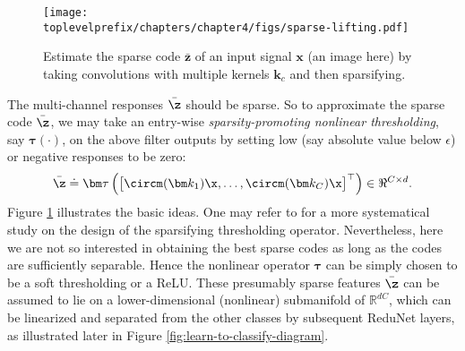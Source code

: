 \documentclass[../../book-main.tex]{subfiles}
\begin{document}
\begin{figure}[t]
	\centerline{
\texttt{[image: \\toplevelprefix/chapters/chapter4/figs/sparse-lifting.pdf]}}
\caption{Estimate the sparse code $\bar{\bm z}$ of an input signal $\bm x$ (an image here) by taking convolutions with multiple kernels $\bm k_c$ and then sparsifying.}
		\label{fig:multi-channel-sparse-lifting}
\end{figure}
The multi-channel responses $\bar \z$ should be sparse. So to approximate the sparse code $\bar \z$, we may take an entry-wise {\em sparsity-promoting nonlinear thresholding}, say $\bm \tau(\cdot)$, on the above filter outputs by setting low (say absolute value below $\epsilon$) or negative  responses to be zero:
\begin{equation}
\bar \z \doteq \bm \tau \left( \big[\circm(\bm k_1) \x, \ldots, \circm(\bm k_C) \x \big]^\top \right) \in \Re^{C \times d}.
\label{eqn:sparse-lifting}
\end{equation} 
Figure \ref{fig:multi-channel-sparse-lifting} illustrates the basic ideas. One may refer to \cite{Analysis-Filter} for a more systematical study on the design of the sparsifying thresholding operator. Nevertheless, here we are not so interested in obtaining the best sparse codes as long as the codes are sufficiently separable. Hence the nonlinear operator $\bm \tau$ can be simply chosen to be a soft thresholding or a ReLU. 
These presumably sparse features $\bar \z$ can be assumed to lie on a lower-dimensional (nonlinear) submanifold of $\mathbb{R}^{dC}$, which can be linearized and separated from the other classes by subsequent ReduNet layers, as illustrated later in Figure \ref{fig:learn-to-classify-diagram}. 
\end{document}
